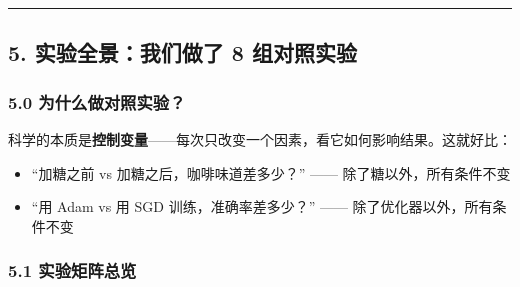 \documentclass[
  11pt,
]{ctexart}
\providecommand{\tightlist}{%
  \setlength{\itemsep}{0pt}\setlength{\parskip}{0pt}}
\begin{document}
\begin{center}\rule{0.5\linewidth}{0.5pt}\end{center}

\subsection{5. 实验全景：我们做了 8
组对照实验}\label{ux5b9eux9a8cux5168ux666fux6211ux4eecux505aux4e86-8-ux7ec4ux5bf9ux7167ux5b9eux9a8c}

\subsubsection{5.0
为什么做对照实验？}\label{ux4e3aux4ec0ux4e48ux505aux5bf9ux7167ux5b9eux9a8c}

科学的本质是\textbf{控制变量}——每次只改变一个因素，看它如何影响结果。这就好比：

\begin{itemize}
\tightlist
\item
  “加糖之前 vs 加糖之后，咖啡味道差多少？” —— 除了糖以外，所有条件不变
\item
  “用 Adam vs 用 SGD 训练，准确率差多少？” ——
  除了优化器以外，所有条件不变
\end{itemize}

\subsubsection{5.1
实验矩阵总览}\label{ux5b9eux9a8cux77e9ux9635ux603bux89c8}
\end{document}
